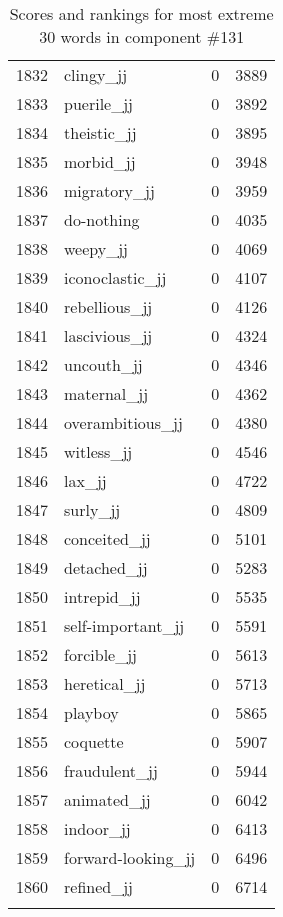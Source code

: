 \begin{longtable}[!htbp]{| rlr@{.}l |}
    1832 & clingy\_jj & 0 & 3889 \\
    1833 & puerile\_jj & 0 & 3892 \\
    1834 & theistic\_jj & 0 & 3895 \\
    1835 & morbid\_jj & 0 & 3948 \\
    1836 & migratory\_jj & 0 & 3959 \\
    1837 & do-nothing & 0 & 4035 \\
    1838 & weepy\_jj & 0 & 4069 \\
    1839 & iconoclastic\_jj & 0 & 4107 \\
    1840 & rebellious\_jj & 0 & 4126 \\
    1841 & lascivious\_jj & 0 & 4324 \\
    1842 & uncouth\_jj & 0 & 4346 \\
    1843 & maternal\_jj & 0 & 4362 \\
    1844 & overambitious\_jj & 0 & 4380 \\
    1845 & witless\_jj & 0 & 4546 \\
    1846 & lax\_jj & 0 & 4722 \\
    1847 & surly\_jj & 0 & 4809 \\
    1848 & conceited\_jj & 0 & 5101 \\
    1849 & detached\_jj & 0 & 5283 \\
    1850 & intrepid\_jj & 0 & 5535 \\
    1851 & self-important\_jj & 0 & 5591 \\
    1852 & forcible\_jj & 0 & 5613 \\
    1853 & heretical\_jj & 0 & 5713 \\
    1854 & playboy & 0 & 5865 \\
    1855 & coquette & 0 & 5907 \\
    1856 & fraudulent\_jj & 0 & 5944 \\
    1857 & animated\_jj & 0 & 6042 \\
    1858 & indoor\_jj & 0 & 6413 \\
    1859 & forward-looking\_jj & 0 & 6496 \\
    1860 & refined\_jj & 0 & 6714 \\
    \hline
    \caption{Scores and rankings for most extreme 30 words in component \#131} \\
\end{longtable}
